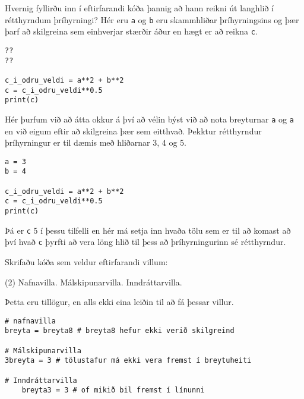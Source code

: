 \begin{exercise}\label{tol5}
	Hvernig fyllirðu inn í eftirfarandi kóða þannig að hann reikni út langhlið í rétthyrndum þríhyrningi?
	Hér eru \texttt{a} og \texttt{b} eru skammhliðar þríhyrningsins og þær þarf að skilgreina sem einhverjar stærðir áður en hægt er að reikna \texttt{c}.
\begin{lstlisting}
??
??

c_i_odru_veldi = a**2 + b**2
c = c_i_odru_veldi**0.5
print(c)\end{lstlisting}
\end{exercise}
\begin{Answer}[ref={tol5}]
	Hér þurfum við að átta okkur á því að vélin býst við að nota breyturnar \texttt{a} og \texttt{a} en við eigum eftir að skilgreina þær sem eitthvað.
	Þekktur rétthyrndur þríhyrningur er til dæmis með hliðarnar 3, 4 og 5.
\begin{lstlisting}
a = 3
b = 4

c_i_odru_veldi = a**2 + b**2
c = c_i_odru_veldi**0.5
print(c)\end{lstlisting}
	Þá er \texttt{c} 5 í þessu tilfelli en hér má setja inn hvaða tölu sem er til að komast að því hvað \texttt{c} þyrfti að vera löng hlið til þess að þríhyrningurinn sé rétthyrndur.
\end{Answer}

\begin{exercise}\label{tol-villa}
	Skrifaðu kóða sem veldur eftirfarandi villum:
	\begin{tasks}(2)
		\task\label{tol-villa1} Nafnavilla.  
		\task\label{tol-villa2} Málskipunarvilla.
		\task\label{tol-villa3} Inndráttarvilla.
	\end{tasks}
\end{exercise}
\begin{Answer}[ref={tol-villa}]
	Þetta eru tillögur, en alls ekki eina leiðin til að fá þessar villur.
\begin{lstlisting}
# nafnavilla
breyta = breyta8 # breyta8 hefur ekki verið skilgreind

# Málskipunarvilla
3breyta = 3 # tölustafur má ekki vera fremst í breytuheiti

# Inndráttarvilla
	breyta3 = 3 # of mikið bil fremst í línunni\end{lstlisting}
\end{Answer}